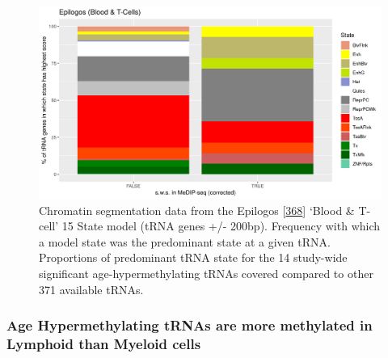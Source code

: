\documentclass[
]{book}
\begin{document}
\begin{figure}

{\centering \includegraphics[width=0.9\linewidth]{./figs/maxScoreBytRNAtRNAge6SplitPlot_BL} 

}

\caption{Chromatin segmentation data from the Epilogos {[}\protect\hyperlink{ref-Meuleman2019}{368}{]} `Blood \& T-cell' 15 State model (tRNA genes +/- 200bp). Frequency with which a model state was the predominant state at a given tRNA. Proportions of predominant tRNA state for the 14 study-wide significant age-hypermethylating tRNAs covered compared to other 371 available tRNAs.}\label{fig:combinedEpilogosPlot}
\end{figure}



\hypertarget{age-hypermethylating-trnas-are-more-methylated-in-lymphoid-than-myeloid-cells}{%
\subsubsection{Age Hypermethylating tRNAs are more methylated in Lymphoid than Myeloid cells}\label{age-hypermethylating-trnas-are-more-methylated-in-lymphoid-than-myeloid-cells}}
\end{document}

